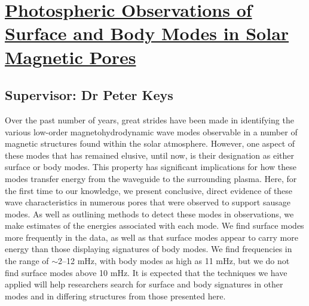 \section{\href{https://doi.org/10.3847/1538-4357/aab432}{Photospheric Observations of Surface and Body Modes in Solar Magnetic Pores}}

 \subsection*{Supervisor: Dr Peter Keys}


Over the past number of years, great strides have been made in identifying 
the various low-order magnetohydrodynamic wave modes observable in a number 
of magnetic structures found within the solar atmosphere. However, one aspect 
of these modes that has remained elusive, until now, is their designation as 
either surface or body modes. This property has significant implications for 
how these modes transfer energy from the waveguide to the surrounding plasma. 
Here, for the first time to our knowledge, we present conclusive, direct 
evidence of these wave characteristics in numerous pores that were observed 
to support sausage modes. As well as outlining methods to detect these modes 
in observations, we make estimates of the energies associated with each mode. 
We find surface modes more frequently in the data, as well as that surface 
modes appear to carry more energy than those displaying signatures of body 
modes. We find frequencies in the range of $\sim$2--12 mHz, with body modes as high 
as 11 mHz, but we do not find surface modes above 10 mHz. It is expected that 
the techniques we have applied will help researchers search for surface and 
body signatures in other modes and in differing structures from those 
presented here.
